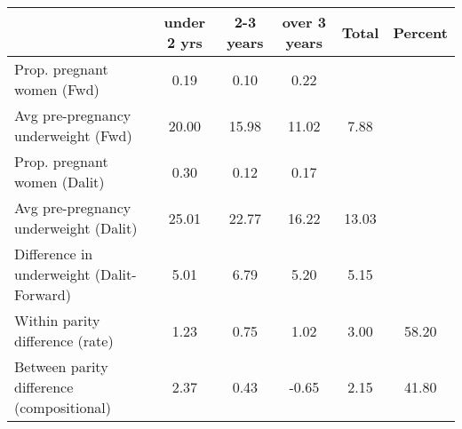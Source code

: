 \begin{tabular}{l*{5}{c}}
\toprule
            &\multicolumn{1}{c}{under 2 yrs}&\multicolumn{1}{c}{2-3 years}&\multicolumn{1}{c}{over 3 years}&\multicolumn{1}{c}{Total}&\multicolumn{1}{c}{Percent}\\
\midrule
\midrule
Prop. pregnant women (Fwd)&        0.19&        0.10&        0.22&            &            \\
Avg pre-pregnancy underweight (Fwd)&       20.00&       15.98&       11.02&        7.88&            \\
Prop. pregnant women (Dalit)&        0.30&        0.12&        0.17&            &            \\
Avg pre-pregnancy underweight (Dalit)&       25.01&       22.77&       16.22&       13.03&            \\
Difference in underweight (Dalit-Forward)&        5.01&        6.79&        5.20&        5.15&            \\
Within parity difference (rate)&        1.23&        0.75&        1.02&        3.00&       58.20\\
Between parity difference (compositional)&        2.37&        0.43&       -0.65&        2.15&       41.80\\
\bottomrule
\end{tabular}
